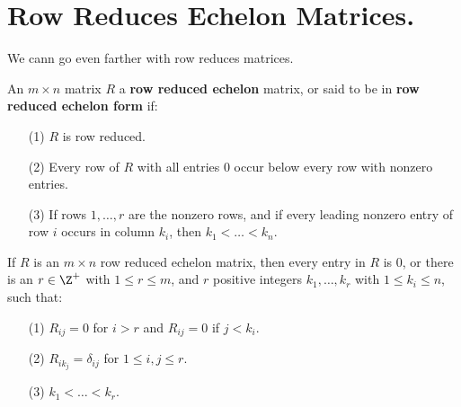 
\section{Row Reduces Echelon Matrices.}
\label{section1}

We cann go even farther with row reduces matrices.

\begin{definition}
    An $m \times n$ matrix $R$ a  \textbf{row reduced echelon} matrix, or said to be in \textbf{row
    reduced echelon form} if:
        \begin{enumerate}
            \item[(1)] $R$ is row reduced.

            \item [(2)] Every row of $R$ with all entries  $0$ occur below every row with nonzero
                entries.

            \item [(3)] If rows $1, \dots, r$ are the nonzero rows, and if every leading nonzero
                entry of row  $i$ occurs in column  $k_i$, then  $k_1 < \dots < k_n$.
        \end{enumerate}
\end{definition}

\begin{lemma}\label{1.3.1}
    If $R$ is an  $m \times n$ row reduced echelon matrix, then every entry in  $R$ is  $0$, or
    there is an  $r \in \Z^+$ with  $1 \leq r \leq m$, and  $r$ positive integers  $k_1, \dots, k_r$
    with $1 \leq k_i \leq n$, such that:
        \begin{enumerate}
            \item[(1)] $R_{ij}=0$ for $i>r$ and  $R_{ij}=0$ if $j<k_i$.

            \item [(2)] $R_{ik_j}=\delta_{ij}$ for $1 \leq i,j \leq r$.

            \item [(3)] $k_1<\dots<k_r$.
        \end{enumerate}
\end{lemma}

